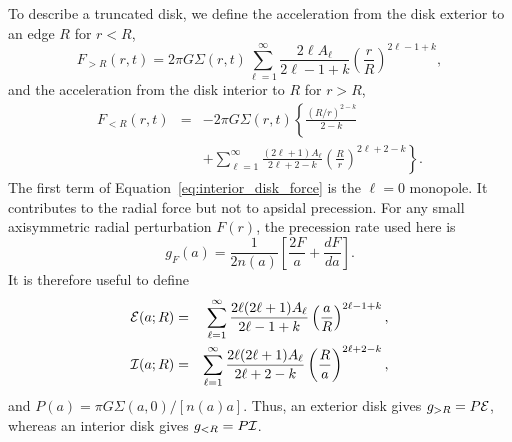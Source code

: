 To describe a truncated disk, we define the acceleration from the disk
exterior to an edge $R$ for $r<R$,
\begin{equation}
    F_{>R}(r,t)=2\pi G\Sigma(r,t)
    \sum_{\ell=1}^{\infty}
    \frac{2\ell A_\ell}{2\ell-1+k}
    \left(\frac{r}{R}\right)^{2\ell-1+k},
\label{eq:exterior_disk_force}
\end{equation}
and the acceleration from the disk interior to $R$ for $r>R$,
\begin{eqnarray}
    F_{<R}(r,t)&=&-2\pi G\Sigma(r,t)
    \left\{\frac{(R/r)^{2-k}}{2-k}\right.\nonumber\\
    &&\left.+\sum_{\ell=1}^{\infty}
    \frac{(2\ell+1)A_\ell}{2\ell+2-k}
    \left(\frac{R}{r}\right)^{2\ell+2-k}\right\}.
\label{eq:interior_disk_force}
\end{eqnarray}
The first term of Equation~\ref{eq:interior_disk_force} is the
$\ell=0$ monopole. It contributes to the radial force but not to apsidal
precession. For any small axisymmetric radial perturbation $F(r)$, the
precession rate used here is
\begin{equation}
    g_F(a)=\frac{1}{2n(a)}
    \left[\frac{2F}{a}+\frac{dF}{da}\right].
\label{eq:force_to_precession}
\end{equation}
It is therefore useful to define
\begin{eqnarray}
    {\cal E}(a;R)&=&
    \sum_{\ell=1}^{\infty}
    \frac{2\ell(2\ell+1)A_\ell}{2\ell-1+k}
    \left(\frac{a}{R}\right)^{2\ell-1+k},
    \nonumber\\
    {\cal I}(a;R)&=&
    \sum_{\ell=1}^{\infty}
    \frac{2\ell(2\ell+1)A_\ell}{2\ell+2-k}
    \left(\frac{R}{a}\right)^{2\ell+2-k},
\label{eq:edge_sums}
\end{eqnarray}
and $P(a)=\pi G\Sigma(a,0)/[n(a)a]$. Thus, an exterior disk gives
$g_{>R}=P{\cal E}$, whereas an interior disk gives $g_{<R}=P{\cal I}$.

